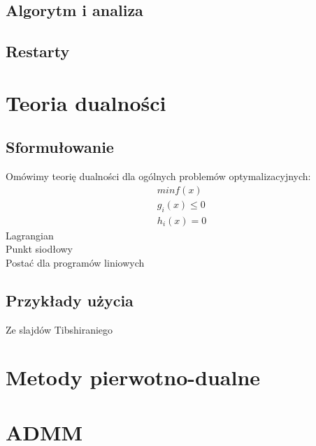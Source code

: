 \documentclass[10pt,a4paper,draft]{report}
\begin{document}
\section{Algorytm i analiza}

\section{Restarty}


\chapter{Teoria dualności}
\section{Sformułowanie}
Omówimy teorię dualności dla ogólnych problemów optymalizacyjnych:
\[
\begin{array}{c}
min f(x) \\
g_i(x) \leq 0 \\
h_i(x) = 0
\end{array}
\]
Lagrangian \\
Punkt siodłowy \\
Postać dla programów liniowych
\section{Przykłady użycia}
Ze slajdów Tibshiraniego

\chapter{Metody pierwotno-dualne}

\chapter{ADMM}
\end{document}

